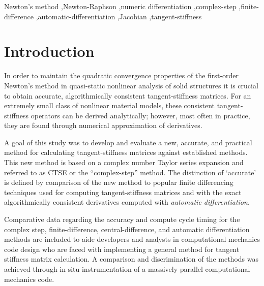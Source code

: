\documentclass[preprint,12pt]{elsarticle}
\begin{document}
\begin{frontmatter}
\begin{keyword}
Newton's method \sep Newton-Raphson \sep numeric differentiation \sep complex-step \sep finite-difference \sep automatic-differentiation \sep Jacobian \sep tangent-stiffness
\end{keyword}

\end{frontmatter}




\section{Introduction}
\label{sec:intro} 

In order to maintain the quadratic convergence properties of the first-order Newton's method \cite{belytschko1999nonlinear} \cite[Ch.~13]{young2009} in quasi-static nonlinear analysis of solid structures it is crucial to obtain accurate, algorithmically consistent tangent-stiffness matrices. For an extremely small class of nonlinear material models, these consistent tangent-stiffness operators can be derived analytically; however, most often in practice, they are found through numerical approximation of derivatives. 

A goal of this study was to develop and evaluate a new, accurate, and practical method for calculating tangent-stiffness matrices against established methods.  This new method is based on a complex number Taylor series expansion and referred to as CTSE or the ``complex-step'' method.  The
distinction of `accurate' is defined by comparison of the new method to popular finite differencing techniques used for computing tangent-stiffness matrices and with the exact algorithmically consistent derivatives computed with \emph{automatic differentiation}.

Comparative data regarding the accuracy and compute cycle timing for the complex step, finite-difference, central-difference, and automatic differentiation methods are included to aide developers and analysts in computational mechanics code design who are faced with implementing a general method for tangent stiffness matrix calculation.  A comparison and discrimination of the methods was achieved through in-situ instrumentation of a massively parallel computational mechanics code.   
\end{document}
